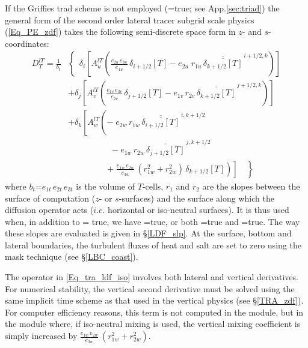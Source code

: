 \documentclass[NEMO_book]{subfiles}
\begin{document}
If the Griffies trad scheme is not employed
(=true; see App.\ref{sec:triad}) the general form of the second order lateral tracer subgrid scale physics 
(\ref{Eq_PE_zdf}) takes the following semi-discrete space form in $z$- and 
$s$-coordinates:
\begin{equation} \label{Eq_tra_ldf_iso}
\begin{split}
 D_T^{lT} = \frac{1}{b_t}   & \left\{   \,\;\delta_i \left[   A_u^{lT}  \left( 
	  \frac{e_{2u}\,e_{3u}}{e_{1u}} \,\delta_{i+1/2}[T]
	- e_{2u}\;r_{1u} \,\overline{\overline{ \delta_{k+1/2}[T] }}^{\,i+1/2,k}
                                                     \right)   \right]   \right.    \\ 
&             +\delta_j \left[ A_v^{lT} \left( 
          \frac{e_{1v}\,e_{3v}}{e_{2v}}  \,\delta_{j+1/2} [T] 
        - e_{1v}\,r_{2v} \,\overline{\overline{ \delta_{k+1/2} [T] }}^{\,j+1/2,k} 
                                                    \right)   \right]                 \\ 
& +\delta_k \left[ A_w^{lT} \left( 
       -\;e_{2w}\,r_{1w} \,\overline{\overline{ \delta_{i+1/2} [T] }}^{\,i,k+1/2}
                                                    \right.   \right.                 \\ 
& \qquad \qquad \quad 
        - e_{1w}\,r_{2w} \,\overline{\overline{ \delta_{j+1/2} [T] }}^{\,j,k+1/2}     \\
& \left. {\left. {   \qquad \qquad \ \ \ \left. {
        +\;\frac{e_{1w}\,e_{2w}}{e_{3w}} \,\left( r_{1w}^2 + r_{2w}^2 \right)
           \,\delta_{k+1/2} [T] } \right) } \right] \quad } \right\} 
 \end{split}
 \end{equation}
where $b_t$=$e_{1t}\,e_{2t}\,e_{3t}$  is the volume of $T$-cells, 
$r_1$ and $r_2$ are the slopes between the surface of computation 
($z$- or $s$-surfaces) and the surface along which the diffusion operator 
acts ($i.e.$ horizontal or iso-neutral surfaces).  It is thus used when, 
in addition to = true, we have =true, 
or both =true and =true. The way these 
slopes are evaluated is given in \S\ref{LDF_slp}. At the surface, bottom 
and lateral boundaries, the turbulent fluxes of heat and salt are set to zero 
using the mask technique (see \S\ref{LBC_coast}). 

The operator in \eqref{Eq_tra_ldf_iso} involves both lateral and vertical 
derivatives. For numerical stability, the vertical second derivative must 
be solved using the same implicit time scheme as that used in the vertical 
physics (see \S\ref{TRA_zdf}). For computer efficiency reasons, this term 
is not computed in the  module, but in the  module 
where, if iso-neutral mixing is used, the vertical mixing coefficient is simply 
increased by $\frac{e_{1w}\,e_{2w} }{e_{3w} }\ \left( {r_{1w} ^2+r_{2w} ^2} \right)$. 
\end{document}
